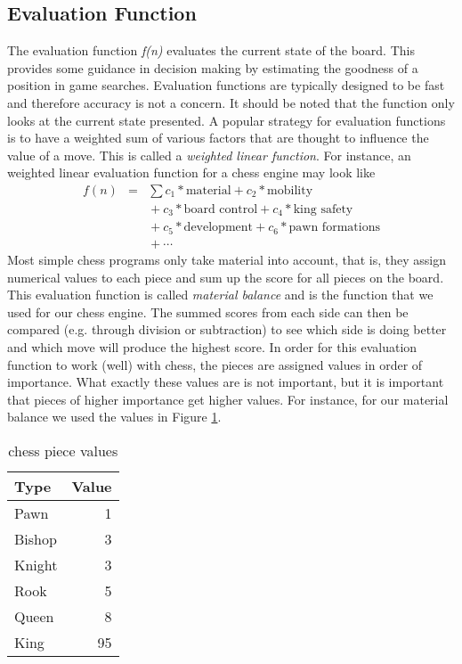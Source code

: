 \documentclass[11pt,letterpaper,twocolumn]{article}
\begin{document}
\subsection{Evaluation Function}
The evaluation function \emph{f(n)} evaluates the current state of the board. This provides some guidance in decision making by estimating the goodness of a position in 
game searches. Evaluation functions are typically designed to be fast and therefore accuracy is not a concern. It should be noted that the function only looks at the
current state presented. A popular strategy for evaluation functions is to have a weighted sum of various factors that are thought to influence the value of a move.
This is called a \emph{weighted linear function}. For instance, an weighted linear evaluation function for a chess engine may look like 
\begin{eqnarray*}
f(n) & = & \sum{c_{1} * \mbox{material} {}+ c_{2} * \mbox{mobility}}\\
& & {}+ c_{3} * \mbox{board control} {}+ c_{4} * \mbox{king safety}\\
& & {}+ c_{5} * \mbox{development} {}+ c_{6} * \mbox{pawn formations}\\
& & {}+ \cdots
\label{evaluation-function}
\end{eqnarray*}
Most simple chess programs only take material into account, that is, they assign numerical values to each piece and sum up the score for all pieces on the board. This
evaluation function is called \emph{material balance} and is the function that we used for our chess engine.
The summed scores from each side can then be compared (e.g. through division or subtraction) to see which side
is doing better and which move will produce the highest score. In order for this evaluation function to work (well) with chess, the pieces are assigned values in order
of importance. What exactly these values are is not important, but it is important that pieces of higher importance get higher values.
For instance, for our material balance we used the values in Figure \ref{material-values}.
\begin{table}[h]
    \begin{tabular}{| l | r |}
    \hline
    Type & Value \\
    \hline
    Pawn & 1 \\
    \hline
    Bishop & 3 \\
    \hline
    Knight & 3 \\
    \hline
    Rook & 5 \\
    \hline
    Queen & 8 \\
    \hline
    King & 95 \\
    \hline
    \end{tabular}
  \caption{chess piece values}
  \label{material-values}
\end{table}
\end{document}
